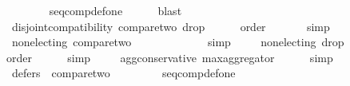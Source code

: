 \begin{isabellebody}
\ \ \ \ \isamarkupfalse%
\ {}{}{}{}{}\ {}{}{}{}{}\ {}{}{}{}{}\ seq{\isacharunderscore}{\kern0pt}comp{\isacharunderscore}{\kern0pt}def{\isacharunderscore}{\kern0pt}one\isanewline
\ \ \ \ \isamarkupfalse%
\ blast\isanewline
\isanewline
\ \ \isamarkupfalse%
\ {}{}{}{\isacharcolon}{\kern0pt}\ {\isachardoublequoteopen}disjoint{\isacharunderscore}{\kern0pt}compatibility\ {\isacharquery}{\kern0pt}compare{\isacharunderscore}{\kern0pt}two\ {\isacharquery}{\kern0pt}drop{}{\isachardoublequoteclose}\isanewline
\ \ \ \ \isamarkupfalse%
\ order\ {}{}{}{}\isanewline
\ \ \ \ \isamarkupfalse%
\ simp\isanewline
\ \ \isamarkupfalse%
\ {}{}{}{\isacharcolon}{\kern0pt}\ {\isachardoublequoteopen}non{\isacharunderscore}{\kern0pt}electing\ {\isacharquery}{\kern0pt}compare{\isacharunderscore}{\kern0pt}two{\isachardoublequoteclose}\isanewline
\ \ \ \ \isamarkupfalse%
\ {}{}{}{}\ {}{}{}{}\isanewline
\ \ \ \ \isamarkupfalse%
\ simp\isanewline
\ \ \isamarkupfalse%
\ {}{}{}{\isacharcolon}{\kern0pt}\ {\isachardoublequoteopen}non{\isacharunderscore}{\kern0pt}electing\ {\isacharquery}{\kern0pt}drop{}{\isachardoublequoteclose}\isanewline
\ \ \ \ \isamarkupfalse%
\ order\isanewline
\ \ \ \ \isamarkupfalse%
\ simp\isanewline
\ \ \isamarkupfalse%
\ {}{}{}{\isacharcolon}{\kern0pt}\ {\isachardoublequoteopen}agg{\isacharunderscore}{\kern0pt}conservative\ max{\isacharunderscore}{\kern0pt}aggregator{\isachardoublequoteclose}\isanewline
\ \ \ \ \isamarkupfalse%
\ simp\isanewline
\ \ \isamarkupfalse%
\ {}{}{}{\isacharcolon}{\kern0pt}\ {\isachardoublequoteopen}defers\ {}\ {\isacharquery}{\kern0pt}compare{\isacharunderscore}{\kern0pt}two{\isachardoublequoteclose}\isanewline
\ \ \ \ \isamarkupfalse%
\ {}{}{}{}\ {}{}{}{}\ {}{}{}{}\ seq{\isacharunderscore}{\kern0pt}comp{\isacharunderscore}{\kern0pt}def{\isacharunderscore}{\kern0pt}one\isanewline

\end{isabellebody}
